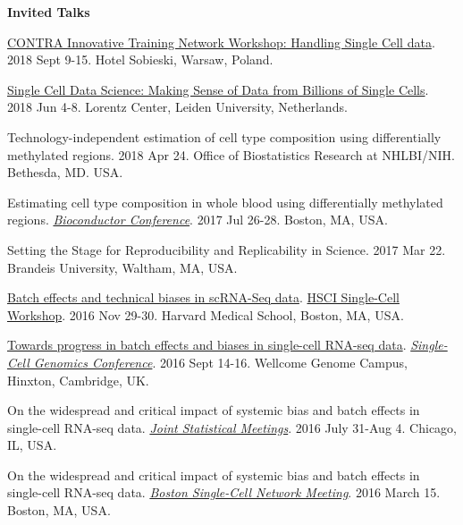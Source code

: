 \documentclass[10pt]{article}
\begin{document}
\textbf{Invited Talks} 
\begin{enumerate}[label= {[\arabic*]}, labelwidth=15pt]
	\item \href{https://www.mimuw.edu.pl/~szczurek/SingleCellContraITN}{CONTRA Innovative Training Network Workshop: Handling Single Cell data}. 2018 Sept 9-15. Hotel Sobieski, Warsaw, Poland. 
	\item \href{http://lorentzcenter.nl/lc/web/2018/986/info.php3?wsid=986&venue=Oort}{Single Cell Data Science: Making Sense of Data from Billions of Single Cells}. 2018 Jun 4-8. Lorentz Center, Leiden University, Netherlands. 
	\item Technology-independent estimation of cell type composition using differentially methylated regions. 2018 Apr 24. Office of Biostatistics Research at NHLBI/NIH. Bethesda, MD. USA. 
	\item Estimating cell type composition in whole blood using differentially methylated regions. \href{http://bioconductor.org/help/course-materials/2017/BioC2017/}{{\it Bioconductor Conference}}. 2017 Jul 26-28. Boston, MA, USA.  
        \item Setting the Stage for Reproducibility and Replicability in Science. 2017 Mar 22. Brandeis University, Waltham, MA, USA.
	\item \href{https://github.com/hms-dbmi/scw/tree/master/scw2016/tutorials/batcheffects}{Batch effects and technical biases in scRNA-Seq data}. \href{http://hsci.harvard.edu/event/save-date-single-cell-analysis-workshop}{HSCI Single-Cell Workshop}. 2016 Nov 29-30. Harvard Medical School, Boston, MA, USA.  
	\item \href{https://speakerdeck.com/stephaniehicks/towards-progress-in-batch-effects-and-biases-in-single-cell-rna-seq-data}{Towards progress in batch effects and biases in single-cell RNA-seq data}. \href{https://coursesandconferences.wellcomegenomecampus.org/events/item.aspx?e=596}{{\it Single-Cell Genomics Conference}}. 2016 Sept 14-16. Wellcome Genome Campus, Hinxton, Cambridge, UK.
	\item On the widespread and critical impact of systemic bias and batch effects in single-cell RNA-seq data. \href{https://www.amstat.org/meetings/jsm/2016/onlineprogram/MainSearchResults.cfm}{{\it Joint Statistical Meetings}}. 2016 July 31-Aug 4. Chicago, IL, USA. 
	\item On the widespread and critical impact of systemic bias and batch effects in single-cell RNA-seq data. \href{http://hsci.harvard.edu/event/widespread-and-critical-impact-systemic-bias-and-batch-effects-single-cell-rna-seq-data?delta=0}{{\it Boston Single-Cell Network Meeting}}. 2016 March 15. Boston, MA, USA. 

\end{enumerate}
\end{document}
